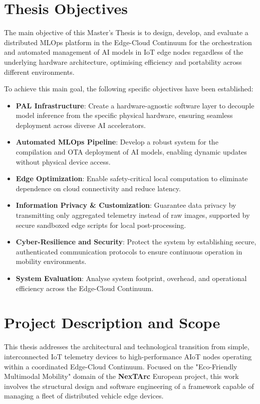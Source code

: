 \section{Thesis Objectives}\label{sec:int:objectives}

The main objective of this Master's Thesis is to design, develop, and evaluate a distributed \gls{MLOps} platform in the Edge-Cloud Continuum for the orchestration and automated management of \gls{AI} models in \gls{IoT} edge nodes regardless of the underlying hardware architecture, optimising efficiency and portability across different environments.

To achieve this main goal, the following specific objectives have been established:

\begin{itemize}
    \item \textbf{\gls{PAL} Infrastructure}: Create a hardware-agnostic software layer to decouple model inference from the specific physical hardware, ensuring seamless deployment across diverse \gls{AI} accelerators.
    \item \textbf{Automated \gls{MLOps} Pipeline}: Develop a robust system for the compilation and \gls{OTA} deployment of \gls{AI} models, enabling dynamic updates without physical device access.
    \item \textbf{Edge Optimization}: Enable safety-critical local computation to eliminate dependence on cloud connectivity and reduce latency.
    \item \textbf{Information Privacy \& Customization}: Guarantee data privacy by transmitting only aggregated telemetry instead of raw images, supported by secure sandboxed edge scripts for local post-processing.
    \item \textbf{Cyber-Resilience and Security}: Protect the system by establishing secure, authenticated communication protocols to ensure continuous operation in mobility environments.
    \item \textbf{System Evaluation}: Analyse system footprint, overhead, and operational efficiency across the Edge-Cloud Continuum.
\end{itemize}

\section{Project Description and Scope}\label{sec:int:scope}

This thesis addresses the architectural and technological transition from simple, interconnected \gls{IoT} telemetry devices to high-performance \gls{AIoT} nodes operating within a coordinated Edge-Cloud Continuum. Focused on the "Eco-Friendly Multimodal Mobility" domain of the \textbf{NexTArc} European project, this work involves the structural design and software engineering of a framework capable of managing a fleet of distributed vehicle edge devices. 

